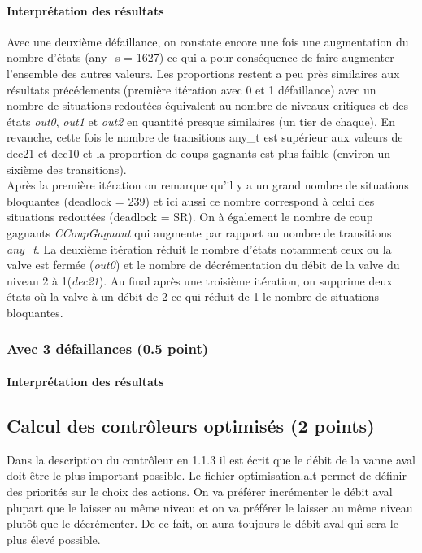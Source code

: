 \documentclass[a4paper]{book}
\begin{document}
\paragraph{Interprétation des résultats}
Avec une deuxième défaillance, on constate encore une fois une augmentation du nombre d'états (any\_s = 1627) ce qui a pour conséquence de faire augmenter l'ensemble 
des autres valeurs. Les proportions restent a peu près similaires aux résultats précédements (première itération avec 0 et 1 défaillance) avec un nombre de situations 
redoutées équivalent au nombre de niveaux critiques et des états  \textit{out0},  \textit{out1} et  \textit{out2} en quantité presque similaires (un tier de chaque). En revanche, 
cette fois le nombre de transitions any\_t est supérieur aux valeurs de dec21 et dec10 et la proportion de coups gagnants est plus faible (environ un sixième des 
transitions). \\
Après la première itération on remarque qu'il y a un grand nombre de situations bloquantes (deadlock = 239) et ici aussi ce nombre correspond à celui des 
situations redoutées (deadlock = SR). On à également le nombre de coup gagnants \textit{CCoupGagnant} qui augmente par rapport au nombre de transitions \textit{any\_t}. 
La deuxième itération réduit le nombre d'états notamment ceux ou la valve est fermée (\textit{out0}) et le nombre de décrémentation du débit de la valve du niveau 2 à 
1(\textit{dec21}). 
Au final après une troisième itération, on supprime deux états où la valve à un débit de 2 ce qui réduit de 1 le nombre de situations bloquantes.

\subsubsection{Avec 3 défaillances (0.5 point)}




%
\paragraph{Interprétation des résultats}

\subsection{Calcul des contrôleurs optimisés (2 points)}

Dans la description du contrôleur en 1.1.3 il est écrit que le débit de la vanne aval doit être le plus important possible.
Le fichier optimisation.alt permet de définir des priorités sur le choix des actions. On va préférer incrémenter le débit aval 
plupart que le laisser au même niveau et on va préférer le laisser au même niveau plutôt que le décrémenter. De ce fait, on aura 
toujours le débit aval qui sera le plus élevé possible.
\end{document}
